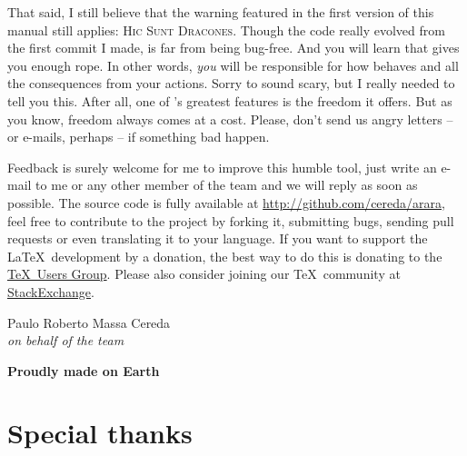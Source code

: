 \documentclass[a4paper,twoside,12pt]{memoir}
\begin{document}
That said, I still believe that the warning featured in the first version of this manual still applies: \textsc{Hic Sunt Dracones}. Though the code really evolved from the first commit I made, \arara is far from being bug-free. And you will learn that \arara gives you enough rope. In other words, \emph{you} will be responsible for how \arara behaves and all the consequences from your actions. Sorry to sound scary, but I really needed to tell you this. After all, one of \arara's greatest features is the freedom it offers. But as you know, freedom always comes at a cost. Please, don't send us angry letters -- or e-mails, perhaps -- if something bad happen.

Feedback is surely welcome for me to improve this humble tool, just write an 
e-mail to me or any other member of the team and we will reply as soon as possible. The source code is fully available at \url{http://github.com/cereda/arara}, feel free to contribute to the project by forking it, submitting bugs, sending pull requests or even translating it to your language. If you want to support the \LaTeX\ development by a donation, the best way to do this is donating to the \href{http://www.tug.org/}{\TeX\ Users Group}. Please also  consider joining our \TeX\ community at \href{http://tex.stackexchange.com}{StackExchange}.

\vspace{2em}

\begin{flushright}
Paulo Roberto Massa Cereda\\
\emph{on behalf of the \arara team}
\end{flushright}

\vfill

\begin{center}
\scalebox{0.55}{\araralogo}

\vspace{0.3em}

{\color{araracolor}\bfseries\large Proudly made on Earth}
\end{center}

\cleardoublepage

\section*{Special thanks}
\end{document}
